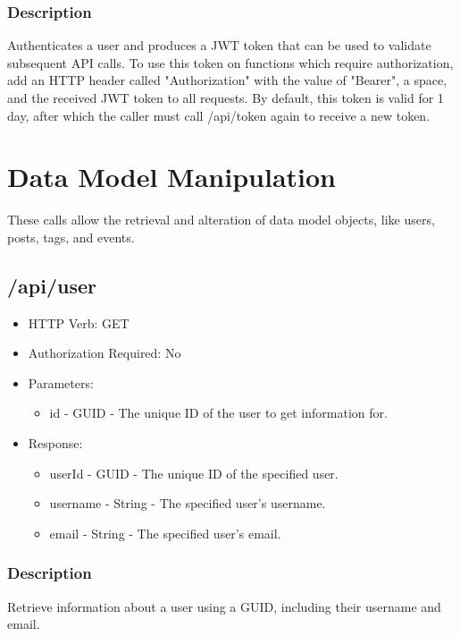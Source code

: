 \documentclass[12pt]{article}
\begin{document}
            \subsubsection{Description}
                Authenticates a user and produces a JWT token that can be used to validate subsequent API calls.
                To use this token on functions which require authorization, add an HTTP header called "Authorization" with the value of "Bearer", a space, and the received JWT token to all requests.
                By default, this token is valid for 1 day, after which the caller must call /api/token again to receive a new token.
    \section{Data Model Manipulation}
        These calls allow the retrieval and alteration of data model objects, like users, posts, tags, and events.

        \subsection{/api/user}
            \begin{itemize}
                \item HTTP Verb: GET
                \item Authorization Required: No
                \item Parameters:
                \begin{itemize}
                    \item id - GUID - The unique ID of the user to get information for.
                \end{itemize}
                \item Response:
                \begin{itemize}
                    \item userId - GUID - The unique ID of the specified user.
                    \item username - String - The specified user's username.
                    \item email - String - The specified user's email.
                \end{itemize}
            \end{itemize}
            \subsubsection{Description}
                Retrieve information about a user using a GUID, including their username and email.
\end{document}
